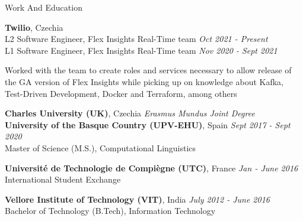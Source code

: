 \documentclass{resume} %
\begin{document}


    
\begin{rSection}{Work And Education}

    {\textbf{Twilio}, Czechia}\\
            L2 Software Engineer, Flex Insights Real-Time team \hfill \textit{Oct 2021 - Present}\\
            L1 Software Engineer, Flex Insights Real-Time team \hfill \textit{Nov 2020 - Sept 2021}
            
    Worked with the team to create roles and services necessary to allow release of the GA version of Flex Insights while picking up on knowledge about Kafka, Test-Driven Development, Docker and Terraform, among others
    
    {\textbf{Charles University (UK)}, Czechia} \hfill
        {\em Erasmus Mundus Joint Degree}\\
    {\textbf{University of the Basque Country (UPV-EHU)}, Spain} \hfill
        {\textit{Sept 2017 - Sept 2020}}\\
            Master of Science (M.S.), Computational Linguistics

    {\textbf{Universit\'e de Technologie de Compi\`egne (UTC)}, France} \hfill
        {\textit{Jan - June 2016}}\\
            International Student Exchange
    
    {\textbf{Vellore Institute of Technology (VIT)}, India} \hfill
        {\textit{July 2012 - June 2016}}\\
            Bachelor of Technology (B.Tech), Information Technology

\end{rSection}
\end{document}
